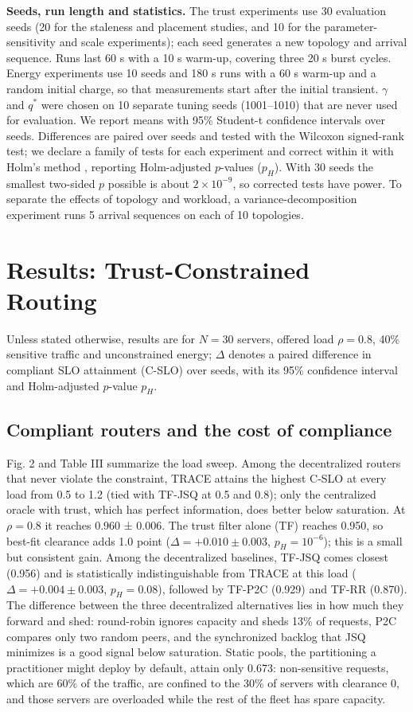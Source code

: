 \documentclass[journal]{IEEEtran}
\begin{document}
\textbf{Seeds, run length and statistics.} The trust experiments use 30 evaluation seeds (20 for the staleness and placement studies, and 10 for the parameter-sensitivity and scale experiments); each seed generates a new topology and arrival sequence. Runs last 60 s with a 10 s warm-up, covering three 20 s burst cycles. Energy experiments use 10 seeds and 180 s runs with a 60 s warm-up and a random initial charge, so that measurements start after the initial transient. \(\gamma\) and \(q^\ast\) were chosen on 10 separate tuning seeds (1001--1010) that are never used for evaluation. We report means with 95\% Student-t confidence intervals over seeds. Differences are paired over seeds and tested with the Wilcoxon signed-rank test; we declare a family of tests for each experiment and correct within it with Holm's method \cite{holm1979}, reporting Holm-adjusted \(p\)-values (\(p_H\)). With 30 seeds the smallest two-sided \(p\) possible is about \(2\times10^{-9}\), so corrected tests have power. To separate the effects of topology and workload, a variance-decomposition experiment runs 5 arrival sequences on each of 10 topologies.

\section{Results: Trust-Constrained Routing}

Unless stated otherwise, results are for \(N=30\) servers, offered load \(\rho=0.8\), 40\% sensitive traffic and unconstrained energy; \(\Delta\) denotes a paired difference in compliant SLO attainment (C-SLO) over seeds, with its 95\% confidence interval and Holm-adjusted \(p\)-value \(p_H\).

\subsection{Compliant routers and the cost of compliance}

Fig. 2 and Table III summarize the load sweep. Among the decentralized routers that never violate the constraint, TRACE attains the highest C-SLO at every load from 0.5 to 1.2 (tied with TF-JSQ at 0.5 and 0.8); only the centralized oracle with trust, which has perfect information, does better below saturation. At \(\rho=0.8\) it reaches 0.960 ± 0.006. The trust filter alone (TF) reaches 0.950, so best-fit clearance adds 1.0 point (\(\Delta=+0.010\pm0.003\), \(p_H=10^{-6}\)); this is a small but consistent gain. Among the decentralized baselines, TF-JSQ comes closest (0.956) and is statistically indistinguishable from TRACE at this load (\(\Delta=+0.004\pm0.003\), \(p_H=0.08\)), followed by TF-P2C (0.929) and TF-RR (0.870). The difference between the three decentralized alternatives lies in how much they forward and shed: round-robin ignores capacity and sheds 13\% of requests, P2C compares only two random peers, and the synchronized backlog that JSQ minimizes is a good signal below saturation. Static pools, the partitioning a practitioner might deploy by default, attain only 0.673: non-sensitive requests, which are 60\% of the traffic, are confined to the 30\% of servers with clearance 0, and those servers are overloaded while the rest of the fleet has spare capacity.
\end{document}
